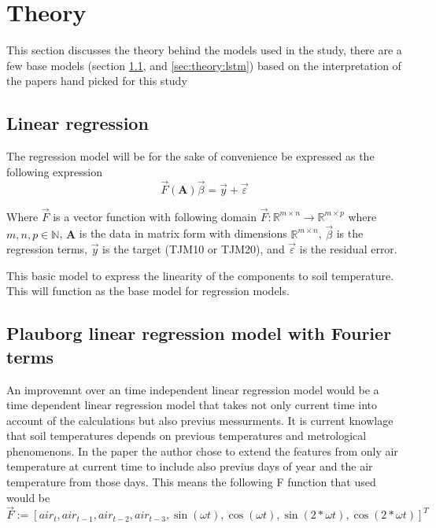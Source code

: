 \section{Theory}\label{sec:theory}

This section discusses the theory behind the models used in the study, there are a few base models (section \ref{sec:theory:linreg}, and \ref{sec:theory:lstm}) based on the interpretation of the papers hand picked for this study

\subsection{Linear regression}\label{sec:theory:linreg}

The regression model will be for the sake of convenience be expressed as the following expression
$$
\vec{F}(\mathbf{A})\vec{\beta}=\vec{y}+\vec{\varepsilon}
$$

Where $\vec{F}$ is a vector function with following domain $\vec{F}:\mathbb{R}^{m\times n}\to \mathbb{R}^{m\times p}$ where $m,n,p\in \mathbb{N}$, $\mathbf{A}$ is the data in matrix form with dimensions $\mathbb{R}^{m\times n}$, $\vec{\beta}$ is the regression terms, $\vec{y}$ is the target (TJM10 or TJM20), and $\vec{\varepsilon}$ is the residual error.

This basic model to express the linearity of the components to soil temperature. This will function as the base model for regression models. 

\subsection[Plauborg Regression]{Plauborg linear regression model with Fourier terms}\label{sec:theory:pluborg}

An improvemnt over an time independent linear regression model would be a time dependent linear regression model that takes not only current time into account of the calculations but also previus messurments. It is current knowlage that soil temperatures depends on previous temperatures and metrological phenomenons. In the paper  the author chose to extend the features from only air temperature at current time to include also previus days of year and the air temperature from those days. This means the following F function that \citeauthor{plauborg_simple_2002} used would be 
$$
\vec{F} := [air_t , air_{t-1}, air_{t-2}, air_{t-3}, \sin(\omega t) , \cos(\omega t), \sin(2*\omega t), \cos(2*\omega t)]^T
$$

